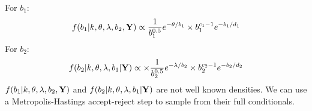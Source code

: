 \documentclass[11pt]{article}
\begin{document}
For $b_1$:
\begin{equation}
f(b_1 | k,\theta,\lambda,b_2, {\bf Y}) \propto \frac{1}{b_1^{0.5}} e^{-\theta/b_1}\times b_1^{c_1-1} e^{-b_1/d_1}
\end{equation}
For $b_2$:
\begin{equation}
f(b_2 | k,\theta,\lambda,b_1| {\bf Y}) \propto \times \frac{1}{b_2^{0.5}} e^{-\lambda/b_2} \times b_2^{c_2-1} e^{-b_2/d_2}
\end{equation}
$f(b_1 | k,\theta,\lambda,b_2, {\bf Y})$ and $f(b_2 |
k,\theta,\lambda,b_1| {\bf Y})$ are not well known densities. We
can use a Metropolis-Hastings accept-reject step to sample from their
full conditionals. 

\end{document}
